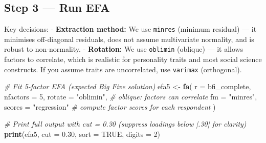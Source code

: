 \documentclass[
]{article}
\newenvironment{Shaded}{\begin{snugshade}}{\end{snugshade}}
\newcommand{\AttributeTok}[1]{\textcolor[rgb]{0.13,0.29,0.53}{#1}}
\newcommand{\CommentTok}[1]{\textcolor[rgb]{0.56,0.35,0.01}{\textit{#1}}}
\newcommand{\ConstantTok}[1]{\textcolor[rgb]{0.56,0.35,0.01}{#1}}
\newcommand{\DecValTok}[1]{\textcolor[rgb]{0.00,0.00,0.81}{#1}}
\newcommand{\FloatTok}[1]{\textcolor[rgb]{0.00,0.00,0.81}{#1}}
\newcommand{\FunctionTok}[1]{\textcolor[rgb]{0.13,0.29,0.53}{\textbf{#1}}}
\newcommand{\NormalTok}[1]{#1}
\newcommand{\OtherTok}[1]{\textcolor[rgb]{0.56,0.35,0.01}{#1}}
\newcommand{\StringTok}[1]{\textcolor[rgb]{0.31,0.60,0.02}{#1}}
\begin{document}
\subsection{Step 3 --- Run EFA}\label{step-3-run-efa}

Key decisions: - \textbf{Extraction method:} We use \texttt{minres}
(minimum residual) --- it minimises off-diagonal residuals, does not
assume multivariate normality, and is robust to non-normality. -
\textbf{Rotation:} We use \texttt{oblimin} (oblique) --- it allows
factors to correlate, which is realistic for personality traits and most
social science constructs. If you assume traits are uncorrelated, use
\texttt{varimax} (orthogonal).

\begin{Shaded}
\begin{Highlighting}[]
\CommentTok{\# Fit 5{-}factor EFA (expected Big Five solution)}
\NormalTok{efa5 }\OtherTok{\textless{}{-}} \FunctionTok{fa}\NormalTok{(}
  \AttributeTok{r         =}\NormalTok{ bfi\_complete,}
  \AttributeTok{nfactors  =} \DecValTok{5}\NormalTok{,}
  \AttributeTok{rotate    =} \StringTok{"oblimin"}\NormalTok{,    }\CommentTok{\# oblique: factors can correlate}
  \AttributeTok{fm        =} \StringTok{"minres"}\NormalTok{,}
  \AttributeTok{scores    =} \StringTok{"regression"}  \CommentTok{\# compute factor scores for each respondent}
\NormalTok{)}

\CommentTok{\# Print full output with cut = 0.30 (suppress loadings below |.30| for clarity)}
\FunctionTok{print}\NormalTok{(efa5, }\AttributeTok{cut =} \FloatTok{0.30}\NormalTok{, }\AttributeTok{sort =} \ConstantTok{TRUE}\NormalTok{, }\AttributeTok{digits =} \DecValTok{2}\NormalTok{)}
\end{Highlighting}
\end{Shaded}
\end{document}
